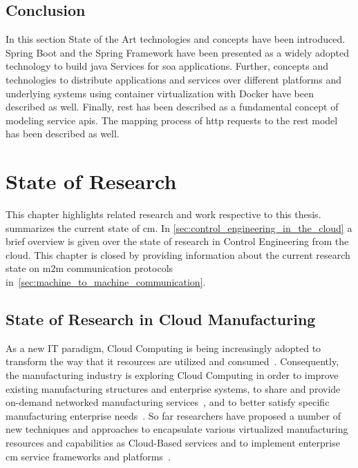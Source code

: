 \documentclass[
a4paper,
twoside,
headsepline,
cleardoublepage=empty,
parskip=half,
draft=false
]{scrbook}
\begin{document}
		\section{Conclusion}\label{sec:state_of_the_art_conclusion}
			
			In this section State of the Art technologies and concepts have been introduced.
			Spring Boot and the Spring Framework have been presented as a widely adopted technology to build \gls{java} Services for \gls{soa} applications.
			Further, concepts and technologies to distribute applications and services over different platforms and underlying systems using container virtualization with Docker have been described as well.
			Finally, \gls{rest} has been described as a fundamental concept of modeling service \gls{api}s. 
			The mapping process of \gls{http} requests to the \gls{rest} model has been described as well.

	\chapter{State of Research} \label{ch:state_of_the_Science}

		This chapter highlights related research and work respective to this thesis.  summarizes the current state of \gls{cm}. In \cref{sec:control_engineering_in_the_cloud} a brief overview is given over the state of research in Control Engineering from the cloud. This chapter is closed by providing information about the current research state on \gls{m2m} communication protocols in~\cref{sec:machine_to_machine_communication}.

		\section{State of Research in Cloud Manufacturing}\label{sec:state_of_science_cloud_manufacturing}

			As a new IT paradigm, Cloud Computing is being increasingly adopted to transform the way that \gls{it} resources are utilized and consumed~\cite{ren2017cloud}. 
			Consequently, the manufacturing industry is exploring Cloud Computing in order to improve existing manufacturing structures and enterprise systems, to share and provide on-demand networked manufacturing services~\cite{ren2017cloud}, and to better satisfy specific manufacturing enterprise needs~\cite{adamson2017cloud}.
			So far researchers have proposed a number of new techniques and approaches to encapsulate various virtualized manufacturing resources and capabilities as Cloud-Based services and to implement enterprise \gls{cm} service frameworks and platforms~\cite{tao2017sdmsim}.
			
\end{document}
